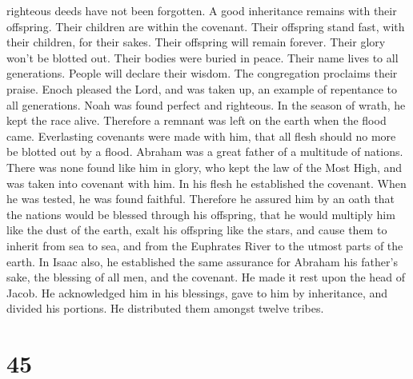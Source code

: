 righteous deeds have not been forgotten.  A good
inheritance remains with their offspring. Their children are within the
covenant.  Their offspring stand fast, with their children,
for their sakes.  Their offspring will remain forever.
Their glory won't be blotted out.  Their bodies were buried
in peace. Their name lives to all generations.  People will
declare their wisdom. The congregation proclaims their praise.
 Enoch pleased the Lord, and was taken up, an example of
repentance to all generations.  Noah was found perfect and
righteous. In the season of wrath, he kept the race alive. Therefore a
remnant was left on the earth when the flood came. 
Everlasting covenants were made with him, that all flesh should no more
be blotted out by a flood.  Abraham was a great father of a
multitude of nations. There was none found like him in glory,
 who kept the law of the Most High, and was taken into
covenant with him. In his flesh he established the covenant. When he was
tested, he was found faithful.  Therefore he assured him by
an oath that the nations would be blessed through his offspring, that he
would multiply him like the dust of the earth, exalt his offspring like
the stars, and cause them to inherit from sea to sea, and from the
Euphrates River to the utmost parts of the earth.  In Isaac
also, he established the same assurance for Abraham his father's sake,
the blessing of all men, and the covenant.  He made it rest
upon the head of Jacob. He acknowledged him in his blessings, gave to
him by inheritance, and divided his portions. He distributed them
amongst twelve tribes.

\hypertarget{section-32}{%
\section{45}\label{section-32}}

